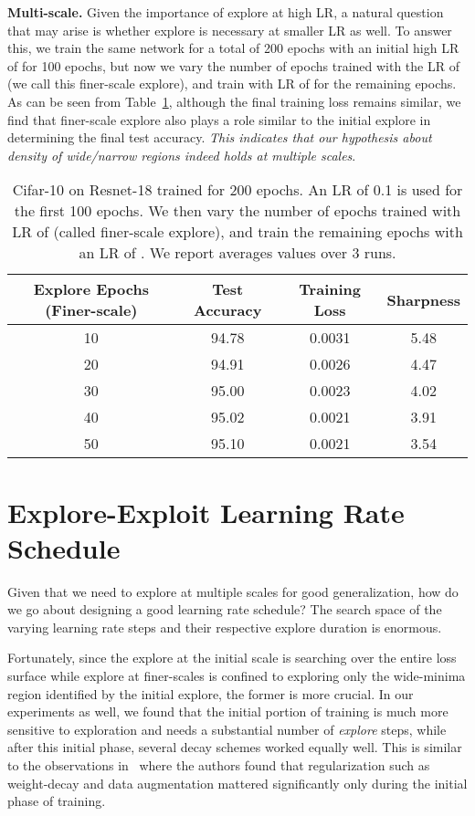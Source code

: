 \documentclass{article} \usepackage{iclr2021_conference,times}
\begin{document}
{\bf Multi-scale.} Given the importance of explore at high LR, a natural question that may arise is whether explore is necessary at smaller LR as well. To answer this, we train the same network for a total of 200 epochs with an initial high LR of  for 100 epochs, but now we vary the number of epochs trained with the LR of  (we call this finer-scale explore), and train with LR of  for the remaining epochs. As can be seen from Table~\ref{tab:finewarmup_accuracy_baseline}, although the final training loss remains similar, we find that finer-scale explore also plays a role similar to the initial explore in determining the final test accuracy. {\it This indicates that our hypothesis about density of wide/narrow regions indeed holds at multiple scales}.

\begin{table}[b]
\small
\centering
\caption{Cifar-10 on Resnet-18 trained for 200 epochs. An LR of 0.1 is used for the first 100 epochs. We then vary the number of epochs trained with LR of  (called finer-scale explore), and train the remaining epochs with an LR of . We report averages values over 3 runs.}
\label{tab:finewarmup_accuracy_baseline}
\begin{tabular}{cccc}
\toprule
Explore Epochs (Finer-scale) & Test Accuracy & Training Loss & Sharpness \\
\midrule
  10 & 94.78 & 0.0031 & 5.48\\ 
  20 & 94.91 & 0.0026 & 4.47\\ 
  30 & 95.00 & 0.0023 & 4.02\\ 
  40 & 95.02 & 0.0021 & 3.91\\ 
  50 & 95.10 & 0.0021 & 3.54\\ 
\bottomrule
\end{tabular}
\vspace{-0.2in}
\end{table}





\section{Explore-Exploit Learning Rate Schedule}

Given that we need to explore at multiple scales for good generalization, how do we go about designing a good learning rate schedule? The search space of the varying learning rate steps and their respective explore duration is enormous. 

Fortunately, since the explore at the initial scale is searching over the entire loss surface while explore at finer-scales is confined to exploring only the wide-minima region identified by the initial explore, the former is more crucial. In our experiments as well, we found that the initial portion of training is much more sensitive to exploration and needs a substantial number of \textit{explore} steps, while after this initial phase, several decay schemes worked equally well. This is similar to the observations in~\citep{golatkar2019time} where the authors found that regularization such as weight-decay and data augmentation mattered significantly only during the initial phase of training.
\end{document}
